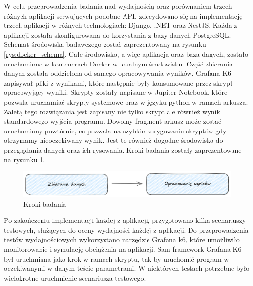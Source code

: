 W celu przeprowadzenia badania nad wydajnością oraz porównaniem trzech różnych aplikacji serwujących podobne API, zdecydowano się na implementację trzech aplikacji w różnych technologiach: Django, .NET oraz NestJS.
Każda z aplikacji została skonfigurowana do korzystania z bazy danych PostgreSQL.
Schemat środowiska badawczego został zaprezentowany na rysunku \ref{rys:docker_schema}.
Całe środowisko, a więc aplikacja oraz baza danych, zostało uruchomione w kontenerach Docker w lokalnym środowisku.
Część zbierania danych została oddzielona od samego opracowywania wyników.
Grafana K6 zapisywał pliki z wynikami, które następnie były konsumowane przez skrypt opracowyjący wyniki.
Skrypty zostały napisane w Jupiter Notebook, które pozwala uruchamiać skrypty systemowe oraz w języku python w ramach arkusza.
Zaletą tego rozwiązania jest zapisany nie tylko skrypt ale również wynik standardowego wyjścia programu.
Dowolny fragment arkusz może zostać uruchomiony powtórnie, co pozwala na szybkie korygowanie skryptów gdy otrzymamy nieoczekiwany wynik.
Jest to również dogodne środowisko do przeglądania danych oraz ich rysowania.
Kroki badania zostały zaprezentowane na rysunku \ref{rys:test_flow}.

\begin{figure}[!hb]
	\centering \includegraphics[width=1\linewidth]{rysunki/test_flow.png}
	\caption{Kroki badania}
	\label{rys:test_flow}
\end{figure}

Po zakończeniu implementacji każdej z aplikacji, przygotowano kilka scenariuszy testowych, służących do oceny wydajności każdej z aplikacji.
Do przeprowadzenia testów wydajnościowych wykorzystano narzędzie Grafana k6, które umożliwiło monitorowanie i symulację obciążenia na aplikacji.
Sam framework Grafana K6 był uruchmiana jako krok w ramach skryptu, tak by uruchomić program w oczekiwanymi w danym teście parametrami.
W niektórych testach potrzebne było wielokrotne uruchmienie scenariusza testowego.


